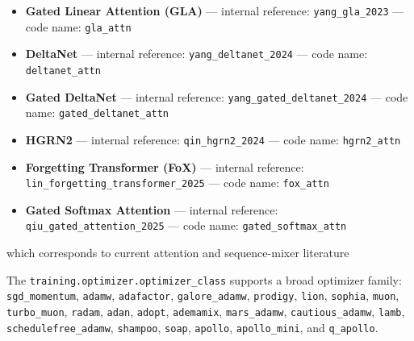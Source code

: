 \documentclass[11pt,a4paper]{article}
\begin{document}
\begin{itemize}[leftmargin=*]
    \item \textbf{Gated Linear Attention (GLA)} --- internal reference: \texttt{yang\_gla\_2023} --- code name: \texttt{gla\_attn}
    \item \textbf{DeltaNet} --- internal reference: \texttt{yang\_deltanet\_2024} --- code name: \texttt{deltanet\_attn}
    \item \textbf{Gated DeltaNet} --- internal reference: \texttt{yang\_gated\_deltanet\_2024} --- code name: \texttt{gated\_deltanet\_attn}
    \item \textbf{HGRN2} --- internal reference: \texttt{qin\_hgrn2\_2024} --- code name: \texttt{hgrn2\_attn}
    \item \textbf{Forgetting Transformer (FoX)} --- internal reference: \texttt{lin\_forgetting\_transformer\_2025} --- code name: \texttt{fox\_attn}
    \item \textbf{Gated Softmax Attention} --- internal reference: \texttt{qiu\_gated\_attention\_2025} --- code name: \texttt{gated\_softmax\_attn}
\end{itemize}

which corresponds to current attention and sequence-mixer literature \citep{sun_retentive_2023,gu_mamba_2023,zhang_continuous_2021,behrouz_titans_2025,ramapuram_theory_2024,vaswani_attention_2017,child_sparse_transformer_2019,beltagy_longformer_2020,zaheer_bigbird_2020,lou_sparsek_2024,yuan_nsa_2025,zhang_spargeattn_2025,wang_fasa_2026,yang_gla_2023,yang_deltanet_2024,yang_gated_deltanet_2024,qin_hgrn2_2024,lin_forgetting_transformer_2025,qiu_gated_attention_2025}

The \texttt{training.optimizer.optimizer\_class} supports a broad optimizer family:
\texttt{sgd\_momentum}, \texttt{adamw}, \texttt{adafactor}, \texttt{galore\_adamw}, \texttt{prodigy}, \texttt{lion}, \texttt{sophia}, \texttt{muon}, \texttt{turbo\_muon}, \texttt{radam}, \texttt{adan}, \texttt{adopt}, \texttt{ademamix}, \texttt{mars\_adamw}, \texttt{cautious\_adamw}, \texttt{lamb}, \texttt{schedulefree\_adamw}, \texttt{shampoo}, \texttt{soap}, \texttt{apollo}, \texttt{apollo\_mini}, and \texttt{q\_apollo}.
\end{document}
